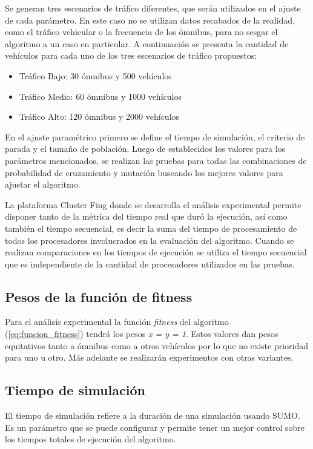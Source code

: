 Se generan tres escenarios de tráfico diferentes, que serán utilizados en el ajuste de cada parámetro. En este caso no se utilizan datos recabados de la realidad, como el tráfico vehicular o la frecuencia de los ómnibus, para no sesgar el algoritmo a un caso en particular.
A continuación se presenta la cantidad de vehículos para cada uno de los tres escenarios de tráfico propuestos:

\begin{itemize}
	\item Tráfico Bajo: 30 ómnibus y 500 vehículos	
	\item Tráfico Medio: 60 ómnibus y 1000 vehículos
	\item Tráfico Alto: 120 ómnibus y 2000 vehículos
\end{itemize}


En el ajuste paramétrico primero se define el tiempo de simulación, el criterio de parada y el tamaño de población. Luego de establecidos los valores para los parámetros mencionados, se realizan las pruebas para todas las combinaciones de probabilidad de cruzamiento y mutación buscando los mejores valores para ajustar el algoritmo.

La plataforma Cluster Fing donde se desarrolla el análisis experimental permite disponer tanto de la métrica del tiempo real que duró la ejecución, así como también el tiempo secuencial, es decir la suma del tiempo de procesamiento de todos los procesadores involucrados en la evaluación del algoritmo. Cuando se realizan comparaciones en los tiempos de ejecución se utiliza el tiempo secuencial que es independiente de la cantidad de procesadores utilizados en las pruebas. 





\subsection{Pesos de la función de fitness}

Para el análisis experimental la función \emph{fitness} del algoritmo (\ref{eq:funcion_fitness}) tendrá los pesos \emph{x = y = 1}. Estos valores dan pesos equitativos tanto a ómnibus como a otros vehículos por lo que no existe prioridad para uno u otro. Más adelante se realizarán experimentos con otras variantes.


\subsection{Tiempo de simulación}
El tiempo de simulación refiere a la duración de una simulación usando SUMO. Es un parámetro que se puede configurar y permite tener un mejor control sobre los tiempos totales de ejecución del algoritmo.

